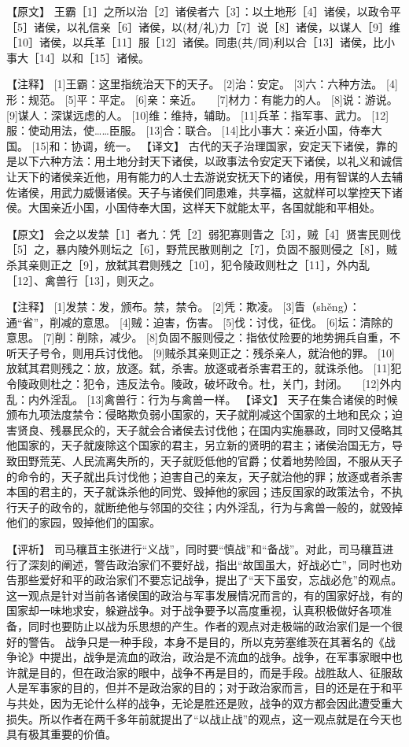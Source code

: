 \documentclass[a4paper,12pt,UTF8,twoside]{ctexbook}
\begin{document}
【原文】
王霸［1］之所以治［2］诸侯者六［3］：以土地形［4］诸侯，以政令平［5］诸侯，以礼信亲［6］诸侯，以(材/礼)力［7］说［8］诸侯，以谋人［9］维［10］诸侯，以兵革［11］服［12］诸侯。同患(共/同)利以合［13］诸侯，比小事大［14］以和［15］诸候。

【注释】
[1]王霸：这里指统治天下的天子。
[2]治：安定。
[3]六：六种方法。
[4]形：规范。
[5]平：平定。
[6]亲：亲近。
　[7]材力：有能力的人。
[8]说：游说。
[9]谋人：深谋远虑的人。
[10]维：维持，辅助。
[11]兵革：指军事、武力。
[12]服：使动用法，使……臣服。
[13]合：联合。
[14]比小事大：亲近小国，侍奉大国。
[15]和：协调，统一。
【译文】
古代的天子治理国家，安定天下诸侯，靠的是以下六种方法：用土地分封天下诸侯，以政事法令安定天下诸侯，以礼义和诚信让天下的诸侯亲近他，用有能力的人士去游说安抚天下的诸侯，用有智谋的人去辅佐诸侯，用武力威慑诸侯。天子与诸侯们同患难，共享福，这就样可以掌控天下诸侯。大国亲近小国，小国侍奉大国，这样天下就能太平，各国就能和平相处。

【原文】
会之以发禁［1］者九：凭［2］弱犯寡则眚之［3］，贼［4］贤害民则伐［5］之，暴内陵外则坛之［6］，野荒民散则削之［7］，负固不服则侵之［8］，贼杀其亲则正之［9］，放弑其君则残之［10］，犯令陵政则杜之［11］，外内乱［12］、禽兽行［13］，则灭之。

【注释】
[1]发禁：发，颁布。禁，禁令。
[2]凭：欺凌。
[3]眚（shěng）：通“省”，削减的意思。
[4]贼：迫害，伤害。
[5]伐：讨伐，征伐。
[6]坛：清除的意思。
[7]削：削除，减少。
[8]负固不服则侵之：指依仗险要的地势拥兵自重，不听天子号令，则用兵讨伐他。
[9]贼杀其亲则正之：残杀亲人，就治他的罪。
[10]放弑其君则残之：放，放逐。弑，杀害。放逐或者杀害君王的，就诛杀他。
[11]犯令陵政则杜之：犯令，违反法令。陵政，破坏政令。杜，关门，封闭。
　[12]外内乱：内外淫乱。
[13]禽兽行：行为与禽兽一样。
【译文】
天子在集合诸侯的时候颁布九项法度禁令：侵略欺负弱小国家的，天子就削减这个国家的土地和民众；迫害贤良、残暴民众的，天子就会合诸侯去讨伐他；在国内实施暴政，同时又侵略其他国家的，天子就废除这个国家的君主，另立新的贤明的君主；诸侯治国无方，导致田野荒芜、人民流离失所的，天子就贬低他的官爵；仗着地势险固，不服从天子的命令的，天子就出兵讨伐他；迫害自己的亲友，天子就治他的罪；放逐或者杀害本国的君主的，天子就诛杀他的同党、毁掉他的家园；违反国家的政策法令，不执行天子的政令的，就断绝他与邻国的交往；内外淫乱，行为与禽兽一般的，就毁掉他们的家园，毁掉他们的国家。

【评析】
司马穰苴主张进行“义战”，同时要“慎战”和“备战”。对此，司马穰苴进行了深刻的阐述，警告政治家们不要好战，指出“故国虽大，好战必亡”，同时也劝告那些爱好和平的政治家们不要忘记战争，提出了“天下虽安，忘战必危”的观点。这一观点是针对当前各诸侯国的政治与军事发展情况而言的，有的国家好战，有的国家却一味地求安，躲避战争。对于战争要予以高度重视，认真积极做好各项准备，同时也要防止以战为乐思想的产生。作者的观点对走极端的政治家们是一个很好的警告。
战争只是一种手段，本身不是目的，所以克劳塞维茨在其著名的《战争论》中提出，战争是流血的政治，政治是不流血的战争。战争，在军事家眼中也许就是目的，但在政治家的眼中，战争不再是目的，而是手段。战胜敌人、征服敌人是军事家的目的，但并不是政治家的目的；对于政治家而言，目的还是在于和平与共处，因为无论什么样的战争，无论是胜还是败，战争的双方都会因此遭受重大损失。所以作者在两千多年前就提出了“以战止战”的观点，这一观点就是在今天也具有极其重要的价值。
\end{document}
